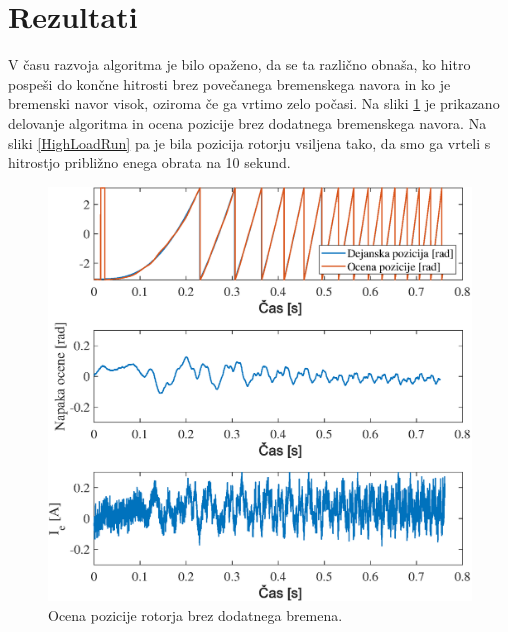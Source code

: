 \documentclass[a4paper,twoside,openright,12pt,slovene]{book}
\begin{document}
\section{Rezultati} \label{rezultati}

V času razvoja algoritma je bilo opaženo, da se ta različno obnaša, ko hitro pospeši do končne hitrosti brez povečanega bremenskega navora in ko je bremenski navor visok, oziroma če ga vrtimo zelo
počasi. Na sliki \ref{NoLoadRun} je prikazano delovanje algoritma in ocena pozicije brez dodatnega bremenskega navora. Na sliki \ref{HighLoadRun} pa je bila pozicija rotorju vsiljena tako, da smo ga
vrteli s hitrostjo približno enega obrata na 10 sekund.

\begin{figure}[!htbp]
    \centering
    \includegraphics[width=0.8\columnwidth]{Slike/NoLoadRun.eps}
    \caption{\label{NoLoadRun} Ocena pozicije rotorja brez dodatnega bremena. }
\end{figure}
\end{document}
